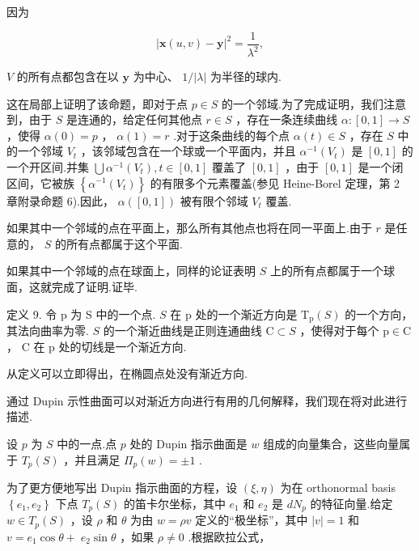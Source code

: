 因为

\[
{\left| \mathbf{x}\left( u,v\right)  - \mathbf{y}\right| }^{2} = \frac{1}{{\lambda }^{2}},
\]

\(V\) 的所有点都包含在以 \(\mathbf{y}\) 为中心、 \(1/\left| \lambda \right|\) 为半径的球内.

这在局部上证明了该命题，即对于点 \(p \in  S\) 的一个邻域.为了完成证明，我们注意到，由于 \(S\) 是连通的，给定任何其他点 \(r \in  S\) ，存在一条连续曲线 \(\alpha  : \left\lbrack  {0,1}\right\rbrack   \rightarrow  S\) ，使得 \(\alpha \left( 0\right)  = p\) ， \(\alpha \left( 1\right)  = r\) .对于这条曲线的每个点 \(\alpha \left( t\right)  \in  S\) ，存在 \(S\) 中的一个邻域 \({V}_{t}\) ，该邻域包含在一个球或一个平面内，并且 \({\alpha }^{-1}\left( {V}_{t}\right)\) 是 \(\left\lbrack  {0,1}\right\rbrack\) 的一个开区间.并集 \(\bigcup {\alpha }^{-1}\left( {V}_{t}\right) ,t \in  \left\lbrack  {0,1}\right\rbrack\) 覆盖了 \(\left\lbrack  {0,1}\right\rbrack\) ，由于 \(\left\lbrack  {0,1}\right\rbrack\) 是一个闭区间，它被族 \(\left\{  {{\alpha }^{-1}\left( {V}_{t}\right) }\right\}\) 的有限多个元素覆盖(参见 Heine-Borel 定理，第 2 章附录命题 6).因此， \(\alpha \left( \left\lbrack  {0,1}\right\rbrack  \right)\) 被有限个邻域 \({V}_{t}\) 覆盖.

如果其中一个邻域的点在平面上，那么所有其他点也将在同一平面上.由于 \(r\) 是任意的， \(S\) 的所有点都属于这个平面.

如果其中一个邻域的点在球面上，同样的论证表明 \(S\) 上的所有点都属于一个球面，这就完成了证明.证毕.

定义 9. 令 \(\mathrm{p}\) 为 S 中的一个点. \(S\) 在 \(\mathrm{p}\) 处的一个渐近方向是 \({\mathrm{T}}_{\mathrm{p}}\left( S\right)\) 的一个方向，其法向曲率为零. \(S\) 的一个渐近曲线是正则连通曲线 \(\mathrm{C} \subset  S\) ，使得对于每个 \(\mathrm{p} \in  \mathrm{C}\) ， \(\mathrm{C}\) 在 \(\mathrm{p}\) 处的切线是一个渐近方向.

从定义可以立即得出，在椭圆点处没有渐近方向.

通过 Dupin 示性曲面可以对渐近方向进行有用的几何解释，我们现在将对此进行描述.

设 \(p\) 为 \(S\) 中的一点.点 \(p\) 处的 Dupin 指示曲面是 \(w\) 组成的向量集合，这些向量属于 \({T}_{p}\left( S\right)\) ，并且满足 \({\Pi }_{p}\left( w\right)  =  \pm  1\) .

为了更方便地写出 Dupin 指示曲面的方程，设 \(\left( {\xi ,\eta }\right)\) 为在 orthonormal basis \(\left\{  {{e}_{1},{e}_{2}}\right\}\) 下点 \({T}_{p}\left( S\right)\) 的笛卡尔坐标，其中 \({e}_{1}\) 和 \({e}_{2}\) 是 \(d{N}_{p}\) 的特征向量.给定 \(w \in  {T}_{p}\left( S\right)\) ，设 \(\rho\) 和 \(\theta\) 为由 \(w = {\rho v}\) 定义的“极坐标”，其中 \(\left| v\right|  = 1\) 和 \(v = {e}_{1}\cos \theta  + \; {e}_{2}\sin \theta\) ，如果 \(\rho  \neq  0\) .根据欧拉公式，

